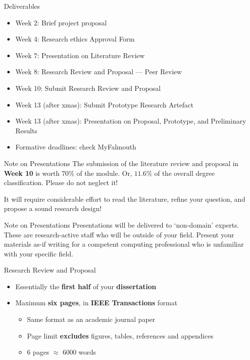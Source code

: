 \begin{frame}{Deliverables}
	\begin{itemize}
		\pause\item Week 2: Brief project proposal
		\pause\item Week 4: Research ethics Approval Form
		\pause\item Week 7: Presentation on Literature Review
		\pause\item Week 8: Research Review and Proposal --- Peer Review
		\pause\item Week 10: Submit Research Review and Proposal
		\pause\item Week 13 (after xmas): Submit Prototype Research Artefact
		\pause\item Week 13 (after xmas): Presentation on Proposal, Prototype, and Preliminary Results
		\pause\item Formative deadlines: check MyFalmouth
	\end{itemize}
\end{frame}

\begin{frame}{Note on Presentations}
	The submission of the literature review and proposal in \textbf{Week 10} is worth \textbf{$70\%$} of the module. Or, $11.6\%$ of the overall degree classification. Please do not neglect it! 
	
	\vspace{2em}
	
	It will require considerable effort to read the literature, refine your question, and propose a sound research design!
\end{frame}

\begin{frame}{Note on Presentations}
	Presentations will be delivered to `non-domain' experts. These are research-active staff who will be outside of your field. Present your materials as-if writing for a competent computing professional who is unfamiliar with your specific field.
\end{frame}

\begin{frame}{Research Review and Proposal}
	\begin{itemize}
		\pause\item Essentially the \textbf{first half} of your \textbf{dissertation}
		\pause\item Maximum \textbf{six pages}, in \textbf{IEEE Transactions} format
			\begin{itemize}
				\pause\item Same format as an academic journal paper
				\pause\item Page limit \textbf{excludes} figures, tables, references and appendices
				\pause\item 6 pages $\approx$ 6000 words
			\end{itemize}
	\end{itemize}
\end{frame}

